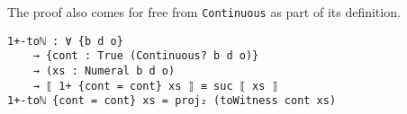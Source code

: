 \documentclass[\main/thesis.tex]{subfiles}
\begin{document}
The proof also comes for free from \lstinline|Continuous| as part of its
definition.

\begin{lstlisting}
1+-toℕ : ∀ {b d o}
    → {cont : True (Continuous? b d o)}
    → (xs : Numeral b d o)
    → ⟦ 1+ {cont = cont} xs ⟧ ≡ suc ⟦ xs ⟧
1+-toℕ {cont = cont} xs = proj₂ (toWitness cont xs)
\end{lstlisting}

%
%
%
%
%
%
%
\end{document}
